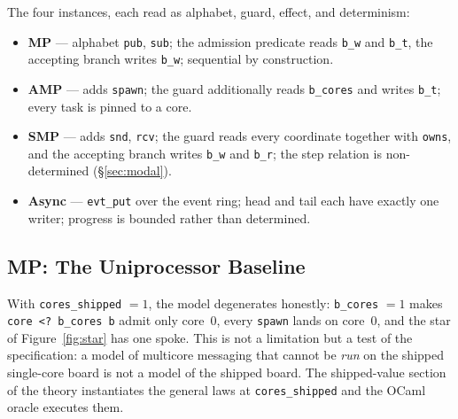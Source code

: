 \documentclass[10pt,journal,compsoc,twocolumn]{article}
\theoremstyle{definition}
\theoremstyle{remark}
\theoremstyle{plain}
\newcommand{\ctr}[1]{\texttt{#1}}
\begin{document}
The four instances, each read as alphabet, guard, effect, and determinism:
\begin{itemize}[leftmargin=*,itemsep=1pt,topsep=2pt]
    \item \textbf{MP} --- alphabet \ctr{pub}, \ctr{sub}; the admission predicate
    reads \ctr{b\_w} and \ctr{b\_t}, the accepting branch writes \ctr{b\_w};
    sequential by construction.
    \item \textbf{AMP} --- adds \ctr{spawn}; the guard additionally reads
    \ctr{b\_cores} and writes \ctr{b\_t}; every task is pinned to a core.
    \item \textbf{SMP} --- adds \ctr{snd}, \ctr{rcv}; the guard reads every
    coordinate together with \ctr{owns}, and the accepting branch writes
    \ctr{b\_w} and \ctr{b\_r}; the step relation is non-determined
    (\S\ref{sec:modal}).
    \item \textbf{Async} --- \ctr{evt\_put} over the event ring; head and tail
    each have exactly one writer; progress is bounded rather than determined.
\end{itemize}

\subsection{MP: The Uniprocessor Baseline}
With \ctr{cores\_shipped} \(=1\), the model degenerates honestly: \ctr{b\_cores} \(=1\) makes \lstinline|core <? b_cores b| admit only core~0, every \ctr{spawn} lands on core~0, and the star of Figure~\ref{fig:star} has one spoke. This is not a limitation but a test of the specification: a model of multicore messaging that cannot be \emph{run} on the shipped single-core board is not a model of the shipped board. The shipped-value section of the theory instantiates the general laws at \ctr{cores\_shipped} and the OCaml oracle executes them.
\end{document}
